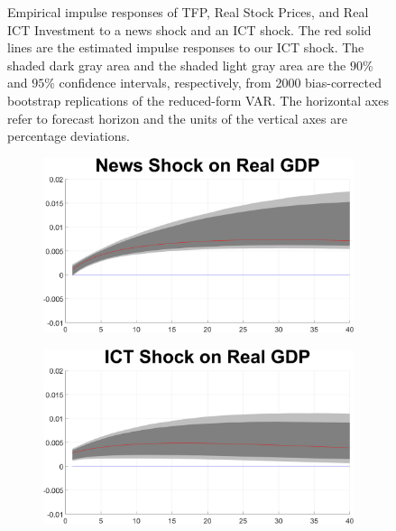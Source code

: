 \documentclass[12pt]{article}
\begin{document}
\begin{figure}[h!]
\begin{subfigure}{.5\textwidth}
\end{subfigure}
	\caption{Empirical impulse responses of TFP, Real Stock Prices, and Real ICT Investment to a news shock and an ICT shock. The red solid lines are the estimated impulse responses to our ICT shock. The shaded dark gray area and the shaded light gray area are the $90$\% and $95$\% confidence intervals, respectively, from 2000 bias-corrected bootstrap replications of the reduced-form VAR. The horizontal axes refer to forecast horizon and the units of the vertical axes are percentage deviations.}
	\label{fig:2stepIRF_first}
\end{figure}

\newpage

\begin{figure}[h!]
\begin{subfigure}{.5\textwidth}
	\centering
	\includegraphics[width=1\linewidth]{MainFigures/fig_News_Shock_on_Real_GDP__controllinNEWS_}
\end{subfigure}%
\begin{subfigure}{.5\textwidth}
	\centering
	\includegraphics[width=1\linewidth]{MainFigures/fig_ICT_Shock_on_Real_GDP__controllinNEWS_}

\end{subfigure}
\end{figure}
\end{document}
